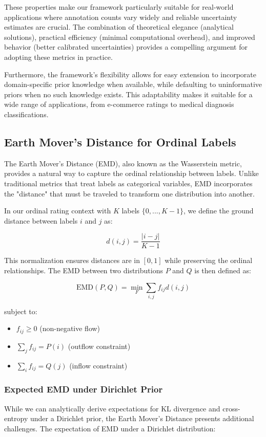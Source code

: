 \documentclass[journal]{IEEEtran}
\begin{document}
These properties make our framework particularly suitable for real-world applications where annotation counts vary widely and reliable uncertainty estimates are crucial. The combination of theoretical elegance (analytical solutions), practical efficiency (minimal computational overhead), and improved behavior (better calibrated uncertainties) provides a compelling argument for adopting these metrics in practice.

Furthermore, the framework's flexibility allows for easy extension to incorporate domain-specific prior knowledge when available, while defaulting to uninformative priors when no such knowledge exists. This adaptability makes it suitable for a wide range of applications, from e-commerce ratings to medical diagnosis classifications.

\subsection{Earth Mover's Distance for Ordinal Labels}
The Earth Mover's Distance (EMD), also known as the Wasserstein metric, provides a natural way to capture the ordinal relationship between labels. Unlike traditional metrics that treat labels as categorical variables, EMD incorporates the "distance" that must be traveled to transform one distribution into another.

In our ordinal rating context with $K$ labels $\{0,...,K-1\}$, we define the ground distance between labels $i$ and $j$ as:

\begin{equation}
d(i,j) = \frac{|i - j|}{K-1}
\end{equation}

This normalization ensures distances are in $[0,1]$ while preserving the ordinal relationships. The EMD between two distributions $P$ and $Q$ is then defined as:

\begin{equation}
\text{EMD}(P,Q) = \min_{F} \sum_{i,j} f_{ij}d(i,j)
\end{equation}

subject to:
\begin{itemize}
\item $f_{ij} \geq 0$ (non-negative flow)
\item $\sum_j f_{ij} = P(i)$ (outflow constraint)
\item $\sum_i f_{ij} = Q(j)$ (inflow constraint)
\end{itemize}


\subsubsection{Expected EMD under Dirichlet Prior}
While we can analytically derive expectations for KL divergence and cross-entropy under a Dirichlet prior, the Earth Mover's Distance presents additional challenges. The expectation of EMD under a Dirichlet distribution:
\end{document}

